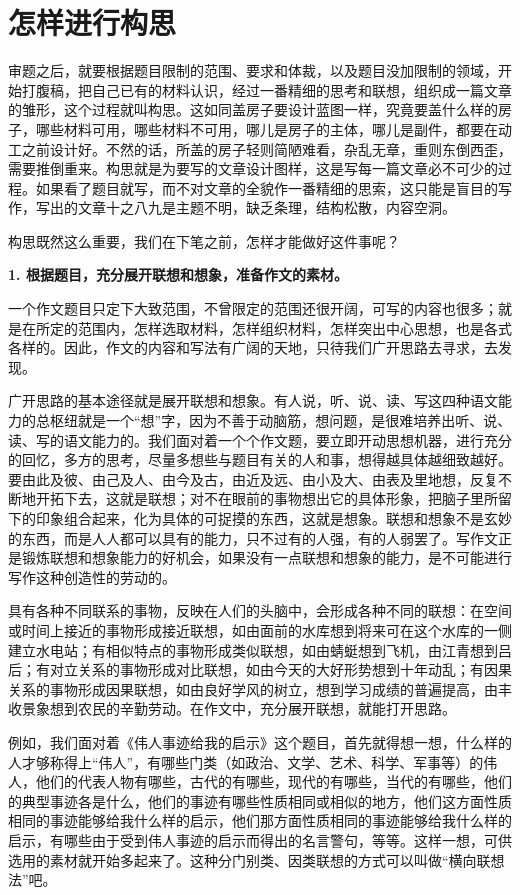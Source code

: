 \section{怎样进行构思}
审题之后，就要根据题目限制的范围、要求和体裁，以及题目没加限制的领域，开始打腹稿，把自己已有的材料认识，经过一番精细的思考和联想，组织成一篇文章的雏形，这个过程就叫构思。这如同盖房子要设计蓝图一样，究竟要盖什么样的房子，哪些材料可用，哪些材料不可用，哪儿是房子的主体，哪儿是副件，都要在动工之前设计好。不然的话，所盖的房子轻则简陋难看，杂乱无章，重则东倒西歪，需要推倒重来。构思就是为要写的文章设计图样，这是写每一篇文章必不可少的过程。如果看了题目就写，而不对文章的全貌作一番精细的思索，这只能是盲目的写作，写出的文章十之八九是主题不明，缺乏条理，结构松散，内容空洞。

构思既然这么重要，我们在下笔之前，怎样才能做好这件事呢？

\textbf{1. 根据题目，充分展开联想和想象，准备作文的素材。}

一个作文题目只定下大致范围，不曾限定的范围还很开阔，可写的内容也很多；就是在所定的范围内，怎样选取材料，怎样组织材料，怎样突出中心思想，也是各式各样的。因此，作文的内容和写法有广阔的天地，只待我们广开思路去寻求，去发现。

广开思路的基本途径就是展开联想和想象。有人说，听、说、读、写这四种语文能力的总枢纽就是一个“想”字，因为不善于动脑筋，想问题，是很难培养出听、说、读、写的语文能力的。我们面对着一个个作文题，要立即开动思想机器，进行充分的回忆，多方的思考，尽量多想些与题目有关的人和事，想得越具体越细致越好。要由此及彼、由己及人、由今及古，由近及远、由小及大、由表及里地想，反复不断地开拓下去，这就是联想；对不在眼前的事物想出它的具体形象，把脑子里所留下的印象组合起来，化为具体的可捉摸的东西，这就是想象。联想和想象不是玄妙的东西，而是人人都可以具有的能力，只不过有的人强，有的人弱罢了。写作文正是锻炼联想和想象能力的好机会，如果没有一点联想和想象的能力，是不可能进行写作这种创造性的劳动的。

具有各种不同联系的事物，反映在人们的头脑中，会形成各种不同的联想：在空间或时间上接近的事物形成接近联想，如由面前的水库想到将来可在这个水库的一侧建立水电站；有相似特点的事物形成类似联想，如由蜻蜓想到飞机，由江青想到吕后；有对立关系的事物形成对比联想，如由今天的大好形势想到十年动乱；有因果关系的事物形成因果联想，如由良好学风的树立，想到学习成绩的普遍提高，由丰收景象想到农民的辛勤劳动。在作文中，充分展开联想，就能打开思路。

例如，我们面对着《伟人事迹给我的启示》这个题目，首先就得想一想，什么样的人才够称得上“伟人”，有哪些门类（如政治、文学、艺术、科学、军事等）的伟人，他们的代表人物有哪些，古代的有哪些，现代的有哪些，当代的有哪些，他们的典型事迹各是什么，他们的事迹有哪些性质相同或相似的地方，他们这方面性质相同的事迹能够给我什么样的启示，他们那方面性质相同的事迹能够给我什么样的启示，有哪些由于受到伟人事迹的启示而得出的名言警句，等等。这样一想，可供选用的素材就开始多起来了。这种分门别类、因类联想的方式可以叫做“横向联想法”吧。
\newpage

